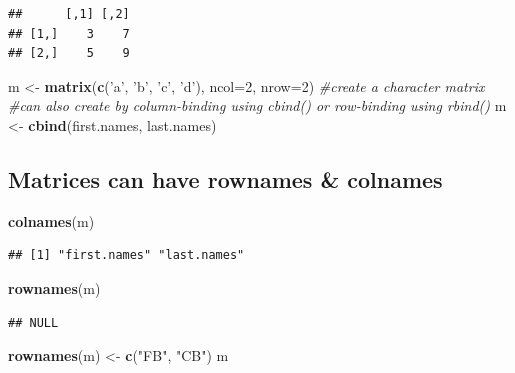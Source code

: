 \documentclass[]{article}
\newenvironment{Shaded}{\begin{snugshade}}{\end{snugshade}}
\newcommand{\KeywordTok}[1]{\textcolor[rgb]{0.13,0.29,0.53}{\textbf{#1}}}
\newcommand{\DataTypeTok}[1]{\textcolor[rgb]{0.13,0.29,0.53}{#1}}
\newcommand{\DecValTok}[1]{\textcolor[rgb]{0.00,0.00,0.81}{#1}}
\newcommand{\StringTok}[1]{\textcolor[rgb]{0.31,0.60,0.02}{#1}}
\newcommand{\CommentTok}[1]{\textcolor[rgb]{0.56,0.35,0.01}{\textit{#1}}}
\newcommand{\NormalTok}[1]{#1}
\begin{document}
\begin{verbatim}
##      [,1] [,2]
## [1,]    3    7
## [2,]    5    9
\end{verbatim}

\begin{Shaded}
\begin{Highlighting}[]
\NormalTok{m <-}\StringTok{ }\KeywordTok{matrix}\NormalTok{(}\KeywordTok{c}\NormalTok{(}\StringTok{'a'}\NormalTok{, }\StringTok{'b'}\NormalTok{, }\StringTok{'c'}\NormalTok{, }\StringTok{'d'}\NormalTok{), }\DataTypeTok{ncol=}\DecValTok{2}\NormalTok{, }\DataTypeTok{nrow=}\DecValTok{2}\NormalTok{) }\CommentTok{#create a character matrix}
\CommentTok{#can also create by column-binding using cbind() or row-binding using rbind()}
\NormalTok{m <-}\StringTok{ }\KeywordTok{cbind}\NormalTok{(first.names, last.names)}
\end{Highlighting}
\end{Shaded}

\subsection{Matrices can have rownames \&
colnames}\label{matrices-can-have-rownames-colnames}

\begin{Shaded}
\begin{Highlighting}[]
\KeywordTok{colnames}\NormalTok{(m)}
\end{Highlighting}
\end{Shaded}

\begin{verbatim}
## [1] "first.names" "last.names"
\end{verbatim}

\begin{Shaded}
\begin{Highlighting}[]
\KeywordTok{rownames}\NormalTok{(m)}
\end{Highlighting}
\end{Shaded}

\begin{verbatim}
## NULL
\end{verbatim}

\begin{Shaded}
\begin{Highlighting}[]
\KeywordTok{rownames}\NormalTok{(m) <-}\StringTok{ }\KeywordTok{c}\NormalTok{(}\StringTok{"FB"}\NormalTok{, }\StringTok{"CB"}\NormalTok{)}
\NormalTok{m}
\end{Highlighting}
\end{Shaded}
\end{document}

